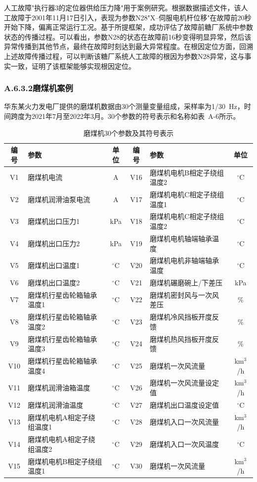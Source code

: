 人工故障"执行器3的定位器供给压力降"用于案例研究。根据数据描述文件，该人工故障于2001年11月17日引入，表现为参数N28"X--伺服电机杆位移"在故障前20秒开始下降，偏离正常运行工况。基于所提框架，成功评估了故障前糖厂系统中参数状态的传播过程。可以看出，参数N28的状态在故障前16秒变得明显异常，然后该异常传播到其他节点，最终在故障时刻达到最大异常程度。在根因定位方面，回溯上述故障传播过程，可以判断该糖厂系统人工故障的根因为参数N28异常，这与事实一致，证明了该框架能够实现根因定位。

\subsubsection*{A.6.3.2\quad 磨煤机案例}

华东某火力发电厂提供的磨煤机数据由30个测量变量组成，采样率为1/30~Hz，时间跨度为2021年7月至2022年3月。30个参数的符号表示和名称如表~A-6所示。

\begin{table}[htbp]
\centering
\caption{磨煤机30个参数及其符号表示}
\label{tab:appA-coal}
\small
\begin{tabular}{clcclc}
\toprule
编号 & 参数 & 单位 & 编号 & 参数 & 单位 \\
\midrule
V1 & 磨煤机电流 & A & V16 & 磨煤机电机B相定子绕组温度2 & $^\circ$C \\
V2 & 磨煤机润滑油泵电流 & A & V17 & 磨煤机电机C相定子绕组温度1 & $^\circ$C \\
V3 & 磨煤机出口压力1 & kPa & V18 & 磨煤机电机C相定子绕组温度2 & $^\circ$C \\
V4 & 磨煤机出口压力2 & kPa & V19 & 磨煤机电机轴端轴承温度 & $^\circ$C \\
V5 & 磨煤机出口温度1 & $^\circ$C & V20 & 磨煤机电机非轴端轴承温度 & $^\circ$C \\
V6 & 磨煤机出口温度2 & $^\circ$C & V21 & 磨煤机碾磨碗上/下差压 & kPa \\
V7 & 磨煤机行星齿轮箱轴承温度1 & $^\circ$C & V22 & 磨煤机密封风与一次风差压 & \% \\
V8 & 磨煤机行星齿轮箱轴承温度2 & $^\circ$C & V23 & 磨煤机冷风挡板开度反馈 & \% \\
V9 & 磨煤机行星齿轮箱轴承温度3 & $^\circ$C & V24 & 磨煤机热风挡板开度反馈 & \% \\
V10 & 磨煤机行星齿轮箱轴承温度4 & $^\circ$C & V25 & 磨煤机一次风流量 & km$^3$/h \\
V11 & 磨煤机润滑油箱温度 & $^\circ$C & V26 & 磨煤机一次风流量设定值 & km$^3$/h \\
V12 & 磨煤机润滑油温度 & $^\circ$C & V27 & 磨煤机出口温度设定值 & $^\circ$C \\
V13 & 磨煤机电机A相定子绕组温度1 & $^\circ$C & V28 & 磨煤机入口一次风流量 & km$^3$/h \\
V14 & 磨煤机电机A相定子绕组温度2 & $^\circ$C & V29 & 磨煤机入口一次风温度 & $^\circ$C \\
V15 & 磨煤机电机B相定子绕组温度1 & $^\circ$C & V30 & 磨煤机一次风流量 & km$^3$/h \\
\bottomrule
\end{tabular}
\end{table}

